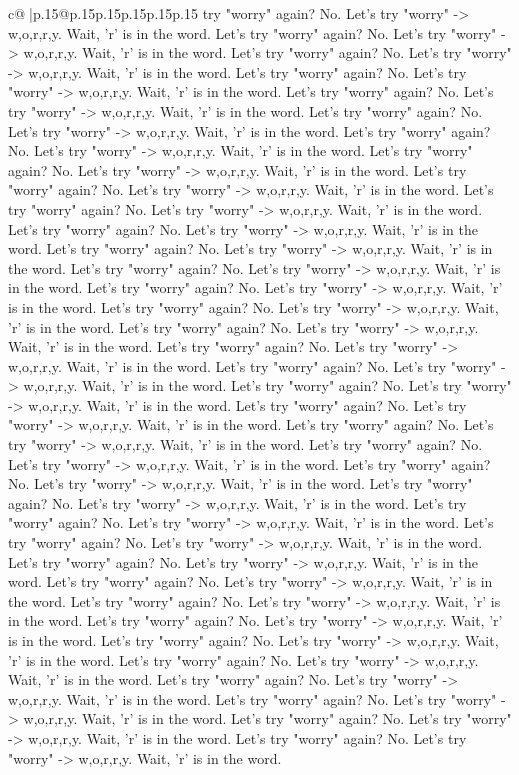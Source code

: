 \documentclass{article}
\begin{document}
{\begin{supertabular}{c@{$\;$}|p{.15\linewidth}@{}p{.15\linewidth}p{.15\linewidth}p{.15\linewidth}p{.15\linewidth}p{.15\linewidth}}
{{{try "worry" again? No. Let's try "worry" {-}> w,o,r,r,y. Wait, 'r' is in the word. Let's try "worry" again? No. Let's try "worry" {-}> w,o,r,r,y. Wait, 'r' is in the word. Let's try "worry" again? No. Let's try "worry" {-}> w,o,r,r,y. Wait, 'r' is in the word. Let's try "worry" again? No. Let's try "worry" {-}> w,o,r,r,y. Wait, 'r' is in the word. Let's try "worry" again? No. Let's try "worry" {-}> w,o,r,r,y. Wait, 'r' is in the word. Let's try "worry" again? No. Let's try "worry" {-}> w,o,r,r,y. Wait, 'r' is in the word. Let's try "worry" again? No. Let's try "worry" {-}> w,o,r,r,y. Wait, 'r' is in the word. Let's try "worry" again? No. Let's try "worry" {-}> w,o,r,r,y. Wait, 'r' is in the word. Let's try "worry" again? No. Let's try "worry" {-}> w,o,r,r,y. Wait, 'r' is in the word. Let's try "worry" again? No. Let's try "worry" {-}> w,o,r,r,y. Wait, 'r' is in the word. Let's try "worry" again? No. Let's try "worry" {-}> w,o,r,r,y. Wait, 'r' is in the word. Let's try "worry" again? No. Let's try "worry" {-}> w,o,r,r,y. Wait, 'r' is in the word. Let's try "worry" again? No. Let's try "worry" {-}> w,o,r,r,y. Wait, 'r' is in the word. Let's try "worry" again? No. Let's try "worry" {-}> w,o,r,r,y. Wait, 'r' is in the word. Let's try "worry" again? No. Let's try "worry" {-}> w,o,r,r,y. Wait, 'r' is in the word. Let's try "worry" again? No. Let's try "worry" {-}> w,o,r,r,y. Wait, 'r' is in the word. Let's try "worry" again? No. Let's try "worry" {-}> w,o,r,r,y. Wait, 'r' is in the word. Let's try "worry" again? No. Let's try "worry" {-}> w,o,r,r,y. Wait, 'r' is in the word. Let's try "worry" again? No. Let's try "worry" {-}> w,o,r,r,y. Wait, 'r' is in the word. Let's try "worry" again? No. Let's try "worry" {-}> w,o,r,r,y. Wait, 'r' is in the word. Let's try "worry" again? No. Let's try "worry" {-}> w,o,r,r,y. Wait, 'r' is in the word. Let's try "worry" again? No. Let's try "worry" {-}> w,o,r,r,y. Wait, 'r' is in the word. Let's try "worry" again? No. Let's try "worry" {-}> w,o,r,r,y. Wait, 'r' is in the word. Let's try "worry" again? No. Let's try "worry" {-}> w,o,r,r,y. Wait, 'r' is in the word. Let's try "worry" again? No. Let's try "worry" {-}> w,o,r,r,y. Wait, 'r' is in the word. Let's try "worry" again? No. Let's try "worry" {-}> w,o,r,r,y. Wait, 'r' is in the word. Let's try "worry" again? No. Let's try "worry" {-}> w,o,r,r,y. Wait, 'r' is in the word. Let's try "worry" again? No. Let's try "worry" {-}> w,o,r,r,y. Wait, 'r' is in the word. Let's try "worry" again? No. Let's try "worry" {-}> w,o,r,r,y. Wait, 'r' is in the word. Let's try "worry" again? No. Let's try "worry" {-}> w,o,r,r,y. Wait, 'r' is in the word. Let's try "worry" again? No. Let's try "worry" {-}> w,o,r,r,y. Wait, 'r' is in the word. Let's try "worry" again? No. Let's try "worry" {-}> w,o,r,r,y. Wait, 'r' is in the word. Let's try "worry" again? No. Let's try "worry" {-}> w,o,r,r,y. Wait, 'r' is in the word. Let's try "worry" again? No. Let's try "worry" {-}> w,o,r,r,y. Wait, 'r' is in the word. Let's try "worry" again? No. Let's try "worry" {-}> w,o,r,r,y. Wait, 'r' is in the word. Let's try "worry" again? No. Let's try "worry" {-}> w,o,r,r,y. Wait, 'r' is in the word. }}}
\end{supertabular}}
\end{document}
